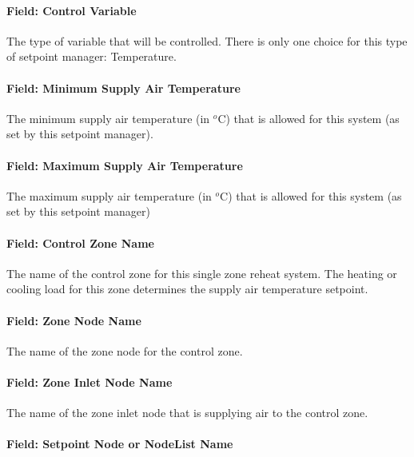 \paragraph{Field: Control Variable}\label{field-control-variable-3}

The type of variable that will be controlled. There is only one choice for this type of setpoint manager: Temperature.

\paragraph{Field: Minimum Supply Air Temperature}\label{field-minimum-supply-air-temperature}

The minimum supply air temperature (in \(^{o}\)C) that is allowed for this system (as set by this setpoint manager).

\paragraph{Field: Maximum Supply Air Temperature}\label{field-maximum-supply-air-temperature}

The maximum supply air temperature (in \(^{o}\)C) that is allowed for this system (as set by this setpoint manager)

\paragraph{Field: Control Zone Name}\label{field-control-zone-name-2016-06-16}

The name of the control zone for this single zone reheat system. The heating or cooling load for this zone determines the supply air temperature setpoint.

\paragraph{Field: Zone Node Name}\label{field-zone-node-name-000}

The name of the zone node for the control zone.

\paragraph{Field: Zone Inlet Node Name}\label{field-zone-inlet-node-name}

The name of the zone inlet node that is supplying air to the control zone.

\paragraph{Field: Setpoint Node or NodeList Name}\label{field-setpoint-node-or-nodelist-name-3}


